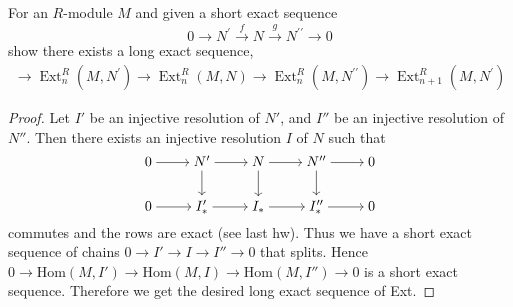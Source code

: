 \begin{problem}
	For an $R$-module $M$ and given a short exact sequence
\[
0 \longrightarrow N^{\prime} \xrightarrow{f} N \xrightarrow{g} N^{\prime \prime} \longrightarrow 0
\]
show there exists a long exact sequence,
\begin{align*}
\longrightarrow\operatorname{Ext}_n^R\left(M, N^{\prime}\right) \longrightarrow \operatorname{Ext}_n^R(M, N) \longrightarrow \operatorname{Ext}_n^R\left(M, N^{\prime \prime}\right) \longrightarrow \operatorname{Ext}_{n+1}^R\left(M, N^{\prime}\right)
\end{align*}
\end{problem}
\begin{proof}
	Let $I'$ be an injective resolution of $N'$, and $I''$ be an injective resolution of $N''$. Then there exists an injective resolution $I$ of $N$ such that
\[\begin{tikzcd}[ampersand replacement=\&,cramped]
	0 \& {N'} \& N \& {N''} \& 0 \\
	0 \& {I'_*} \& {I_*} \& {I''_*} \& 0
	\arrow[from=1-2, to=2-2]
	\arrow[from=1-3, to=2-3]
	\arrow[from=1-4, to=2-4]
	\arrow[from=1-1, to=1-2]
	\arrow[from=1-2, to=1-3]
	\arrow[from=1-3, to=1-4]
	\arrow[from=1-4, to=1-5]
	\arrow[from=2-1, to=2-2]
	\arrow[from=2-2, to=2-3]
	\arrow[from=2-3, to=2-4]
	\arrow[from=2-4, to=2-5]
\end{tikzcd}\]	
commutes and the rows are exact (see last hw). Thus we have a short exact sequence of chains $0 \to I' \to I \to I'' \to 0$ that splits. Hence $0\to \text{Hom}(M, I') \to \text{Hom}(M, I) \to \text{Hom}(M, I'') \to 0$ is a short exact sequence. Therefore we get the desired long exact sequence of Ext.
\end{proof}


